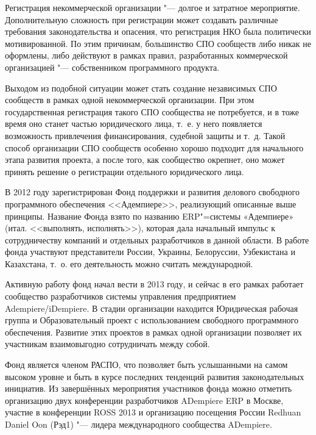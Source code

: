\documentclass[10pt, a5paper]{article}
\begin{document}
Регистрация некоммерческой организации "--- долгое и затратное мероприятие. Дополнительную сложность при регистрации может создавать различные требования законодательства и опасения, что регистрация НКО была политически мотивированной. По этим причинам, большинство СПО сообществ либо никак не оформлены, либо действуют в рамках правил, разработанных коммерческой организацией "--- собственником программного продукта.

Выходом из подобной ситуации может стать создание независимых СПО сообществ в рамках одной некоммерческой организации. При этом государственная регистрация такого СПО сообщества не потребуется, и в тоже время оно станет частью юридического лица, т.~е. у него появляется возможность привлечения финансирования, судебной защиты и т.~д. Такой способ организации СПО сообществ особенно хорошо подходит для начального этапа развития проекта, а после того, как сообщество окрепнет, оно может принять решение о регистрации отдельного юридического лица.

В 2012 году зарегистрирован Фонд поддержки и развития делового свободного программного обеспечения <<Адемпиере>>, реализующий описанные выше принципы. Название Фонда взято по названию ERP"=системы «Адемпиере» (итал. <<выполнять, исполнять>>), которая дала начальный импульс к сотрудничеству компаний и отдельных разработчиков в данной области. В работе фонда участвуют представители России, Украины, Белоруссии, Узбекистана и Казахстана, т.~о. его деятельность можно считать международной.

Активную работу фонд начал вести в 2013 году, и сейчас в его рамках работает сообщество разработчиков системы управления предприятием Adempiere/iDempiere. В стадии организации находится Юридическая рабочая группа и Образовательный проект с использованием свободного программного обеспечения. Развитие этих проектов в рамках одной организации позволяет их участникам взаимовыгодно сотрудничать между собой.

Фонд является членом РАСПО, что позволяет быть услышанными на самом высоком уровне и быть в курсе последних тенденций развития законодательных инициатив. Из завершённых мероприятия участников фонда можно отметить организацию двух конференции разработчиков ADempiere ERP в Москве, участие в конференции ROSS 2013 и организацию посещения России Redhuan Daniel Oon (Рэд1) "--- лидера международного сообщества ADempiere.
\end{document}
